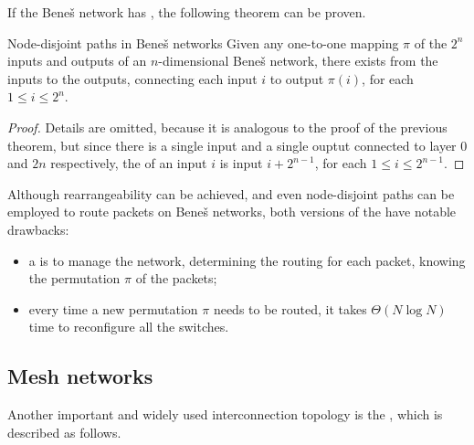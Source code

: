 \documentclass[a4paper, 12pt]{report}
\begin{document}
    If the Beneš network has , the following  theorem can be proven.

    \begin{framedthm}{Node-disjoint paths in Beneš networks}
        Given any one-to-one mapping $\pi$ of the $2^n$ inputs and outputs of an $n$-dimensional Beneš network, there exists  from the inputs to the outputs, connecting each input $i$ to output $\pi(i)$, for each $1 \le i \le 2^n$.
    \end{framedthm}

    \begin{proof}
        Details are omitted, because it is analogous to the proof of the previous theorem, but since there is a single input and a single ouptut connected to layer 0 and $2n$ respectively, the  of an input $i$ is input $i + 2^{n - 1}$, for each $1 \le i \le 2^{n - 1}$.

    \end{proof}

    Although rearrangeability can be achieved, and even node-disjoint paths can be employed to route packets on Beneš networks, both versions of the  have notable drawbacks:

    \begin{itemize}
        \item a  is  to manage the network, determining the routing for each packet, knowing the permutation $\pi$ of the packets;
        \item every time a new permutation $\pi$ needs to be routed, it takes $\Theta(N \log N)$ time to reconfigure all the switches.
    \end{itemize}
    
    \subsection{Mesh networks}

    Another important and widely used interconnection topology is the , which is described as follows.
\end{document}
